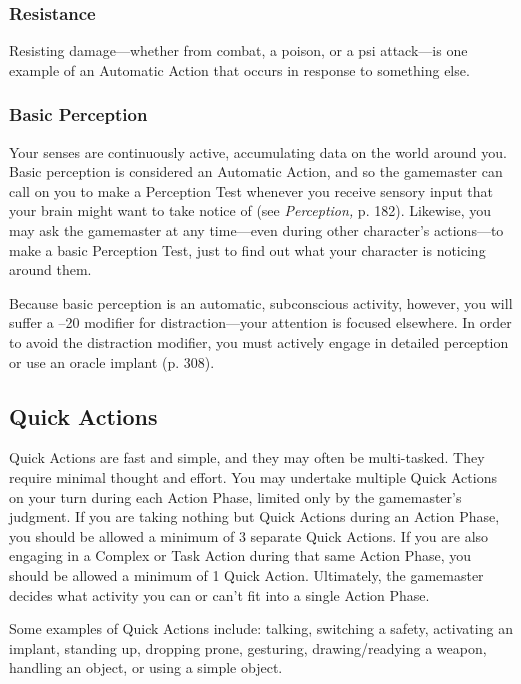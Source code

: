 \subsubsection{Resistance}

Resisting damage—whether from combat, a poison, or 
a psi attack—is one example of an Automatic Action 
that occurs in response to something else.

\subsubsection{Basic Perception}

Your senses are continuously active, accumulating data 
on the world around you. Basic perception is considered
an Automatic Action, and so the gamemaster can
call on you to make a Perception Test whenever you 
receive sensory input that your brain might want to 
take notice of (see \textit{Perception,} p. 182). Likewise, you 
may ask the gamemaster at any time—even during 
other character's actions—to make a basic Perception 
Test, just to find out what your character is noticing 
around them.

Because basic perception is an automatic, subconscious
activity, however, you will suffer a –20 modifier
for distraction—your attention is focused elsewhere. 
In order to avoid the distraction modifier, you must 
actively engage in detailed perception or use an oracle 
implant (p. 308).

\subsection{Quick Actions}

Quick Actions are fast and simple, and they may often 
be multi-tasked. They require minimal thought and 
effort. You may undertake multiple Quick Actions on 
your turn during each Action Phase, limited only by 
the gamemaster's judgment. If you are taking nothing
but Quick Actions during an Action Phase, you
should be allowed a minimum of 3 separate Quick 
Actions. If you are also engaging in a Complex or Task 
Action during that same Action Phase, you should be 
allowed a minimum of 1 Quick Action. Ultimately, the 
gamemaster decides what activity you can or can't fit 
into a single Action Phase.

Some examples of Quick Actions include: talking, 
switching a safety, activating an implant, standing 
up, dropping prone, gesturing, drawing/readying a 
weapon, handling an object, or using a simple object.

